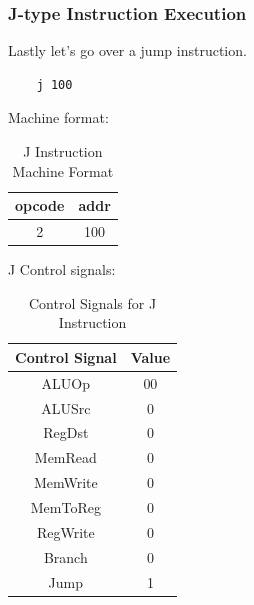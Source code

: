 \subsubsection{J-type Instruction Execution}
Lastly let's go over a jump instruction.

\begin{verbatim}
    j 100
\end{verbatim}

Machine format:
\begin{table}[H]
    \centering
    \begin{tabular}{|c|c|}
    \hline
    \textbf{opcode} & \textbf{addr} \\ \hline
    2             & 100          \\ \hline
    \end{tabular}
    \caption{J Instruction Machine Format}
    \label{tab:j_instruction}
\end{table}

J Control signals:
\begin{table}[H]
    \centering
    \begin{tabular}{|c|c|}
    \hline
    \textbf{Control Signal} & \textbf{Value} \\ \hline
    ALUOp                   & 00             \\ \hline
    ALUSrc                  & 0             \\ \hline
    RegDst                  & 0             \\ \hline
    MemRead                 & 0             \\ \hline
    MemWrite                & 0             \\ \hline
    MemToReg                & 0             \\ \hline
    RegWrite                & 0             \\ \hline
    Branch                  & 0             \\ \hline
    Jump                 & 1             \\ \hline
    \end{tabular}
    \caption{Control Signals for J Instruction}
    \label{tab:j_control_signals}
\end{table}

